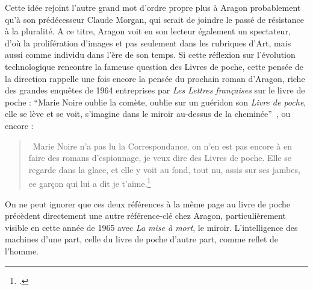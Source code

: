 	Cette idée rejoint l’autre grand mot d’ordre propre plus à Aragon probablement qu’à son prédécesseur Claude Morgan, qui serait de joindre le passé de résistance à la pluralité. A ce titre, Aragon voit en son lecteur également un spectateur, d’où la prolifération d’images et pas seulement dans les rubriques d’Art, mais aussi comme individu dans l’ère de son temps. Si cette réflexion sur l’évolution technologique rencontre la fameuse question des Livres de poche, cette pensée de la direction rappelle une fois encore la pensée du prochain roman d’Aragon, riche des grandes enquêtes de 1964 entreprises par \emph{Les Lettres françaises} sur le livre de poche : \enquote{Marie Noire oublie la comète, oublie sur un guéridon son \emph{Livre de poche}, elle se lève et se voit, s’imagine dans le miroir au-dessus de la cheminée} , ou encore :
	\begin{quote}
	 Marie Noire n’a pas lu la Correspondance, on n’en est pas encore à en faire des romans d’espionnage, je veux dire des Livres de poche. Elle se regarde dans la glace, et elle y voit au fond, tout nu, assis sur ses jambes, ce garçon qui lui a dit je t’aime.\footcite[p102]{blancheouloubli}\end{quote}

	  On ne peut ignorer que ces deux références à la même page au livre de poche précèdent directement une autre référence-clé chez Aragon, particulièrement visible en cette année de 1965 avec \emph{La mise à mort}, le miroir. L’intelligence des machines d’une part, celle du livre de poche d’autre part, comme reflet de l’homme. 


